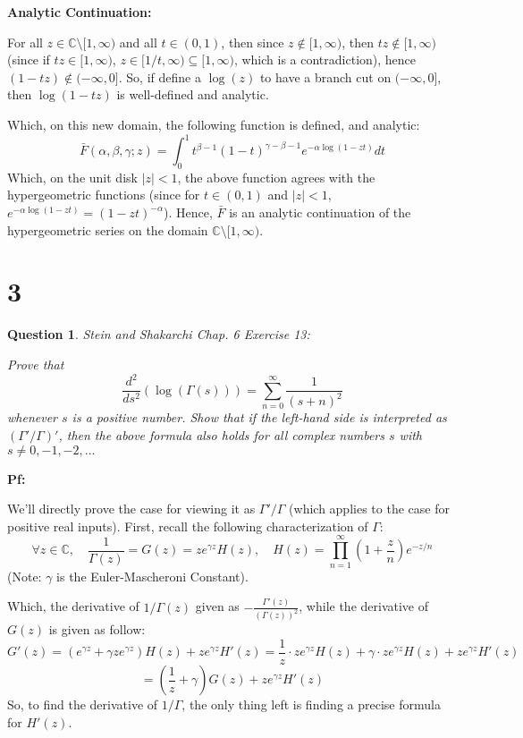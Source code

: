 \documentclass{article}
\newtheorem{question}{Question}
\begin{document}
\textbf{Analytic Continuation:}

For all $z\in\mathbb{C}\setminus[1,\infty)$ and all $t\in (0,1)$, then since $z\notin [1,\infty)$, then $tz\notin [1,\infty)$ (since if $tz\in [1,\infty)$, $z\in [1/t,\infty)\subseteq [1,\infty)$, which is a contradiction), hence $(1-tz)\notin (-\infty,0]$.
So, if define a $\log(z)$ to have a branch cut on $(-\infty,0]$, then $\log(1-tz)$ is well-defined and analytic.

Which, on this new domain, the following function is defined, and analytic:
$$\bar{F}(\alpha,\beta,\gamma;z)=\int_{0}^{1}t^{\beta-1}(1-t)^{\gamma-\beta-1}e^{-\alpha\log(1-zt)}dt$$
Which, on the unit disk $|z|<1$, the above function agrees with the hypergeometric functions (since for $t\in (0,1)$ and $|z|<1$, $e^{-\alpha\log(1-zt)}=(1-zt)^{-\alpha}$). Hence, $\bar{F}$ is an analytic continuation of the hypergeometric series on the domain $\mathbb{C}\setminus[1,\infty)$.

\break

\section*{3}
\begin{myBox}[]{}
    \begin{question}
        Stein and Shakarchi Chap. 6 Exercise 13:

        Prove that
        $$\frac{d^2}{ds^2}(\log(\Gamma(s)))=\sum_{n=0}^{\infty}\frac{1}{(s+n)^2}$$
        whenever $s$ is a positive number. Show that if the left-hand side is interpreted
        as $(\Gamma'/\Gamma)'$, then the above formula also holds for all complex numbers $s$ with
        $s\neq 0,-1,-2,...$
    \end{question}
\end{myBox}

\textbf{Pf:}

We'll directly prove the case for viewing it as $\Gamma'/\Gamma$ (which applies to the case for positive real inputs).
First, recall the following characterization of $\Gamma$:
$$\forall z\in\mathbb{C},\quad \frac{1}{\Gamma(z)}=G(z)=ze^{\gamma z}H(z),\quad H(z)=\prod_{n=1}^{\infty}\left(1+\frac{z}{n}\right)e^{-z/n}$$
(Note: $\gamma$ is the Euler-Mascheroni Constant).

Which, the derivative of $1/\Gamma(z)$ given as $-\frac{\Gamma'(z)}{(\Gamma(z))^2}$, while the derivative of $G(z)$ is given as follow:
$$G'(z)=\left(e^{\gamma z}+\gamma ze^{\gamma z}\right)H(z)+ze^{\gamma z}H'(z) = \frac{1}{z}\cdot ze^{\gamma z}H(z)+\gamma\cdot ze^{\gamma z}H(z)+ze^{\gamma z}H'(z)$$
$$ = \left(\frac{1}{z}+\gamma\right)G(z)+ze^{\gamma z}H'(z)$$
So, to find the derivative of $1/\Gamma$, the only thing left is finding a precise formula for $H'(z)$.
\end{document}
